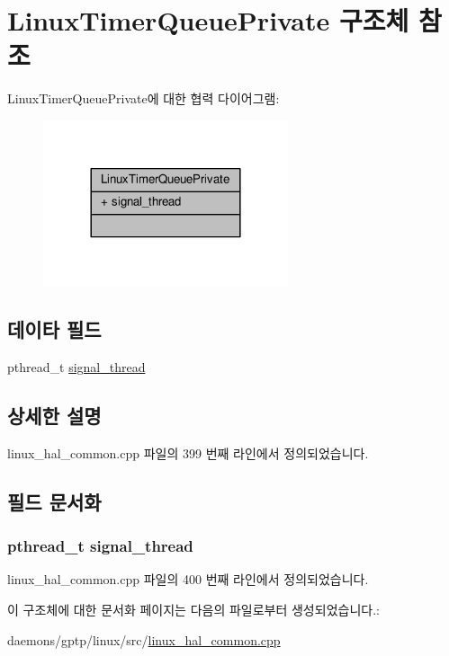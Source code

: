 \hypertarget{struct_linux_timer_queue_private}{}\section{Linux\+Timer\+Queue\+Private 구조체 참조}
\label{struct_linux_timer_queue_private}


Linux\+Timer\+Queue\+Private에 대한 협력 다이어그램\+:
\nopagebreak
\begin{figure}[H]
\begin{center}
\leavevmode
\includegraphics[width=204pt]{struct_linux_timer_queue_private__coll__graph}
\end{center}
\end{figure}
\subsection*{데이타 필드}
\begin{DoxyCompactItemize}
\item 
pthread\+\_\+t \hyperlink{struct_linux_timer_queue_private_a62d0a2e78babe1e8a32b2a09a5d4e197}{signal\+\_\+thread}
\end{DoxyCompactItemize}


\subsection{상세한 설명}


linux\+\_\+hal\+\_\+common.\+cpp 파일의 399 번째 라인에서 정의되었습니다.



\subsection{필드 문서화}
\subsubsection[{\texorpdfstring{signal\+\_\+thread}{signal_thread}}]{\setlength{\rightskip}{0pt plus 5cm}pthread\+\_\+t signal\+\_\+thread}\hypertarget{struct_linux_timer_queue_private_a62d0a2e78babe1e8a32b2a09a5d4e197}{}\label{struct_linux_timer_queue_private_a62d0a2e78babe1e8a32b2a09a5d4e197}


linux\+\_\+hal\+\_\+common.\+cpp 파일의 400 번째 라인에서 정의되었습니다.



이 구조체에 대한 문서화 페이지는 다음의 파일로부터 생성되었습니다.\+:\begin{DoxyCompactItemize}
\item 
daemons/gptp/linux/src/\hyperlink{linux__hal__common_8cpp}{linux\+\_\+hal\+\_\+common.\+cpp}\end{DoxyCompactItemize}
